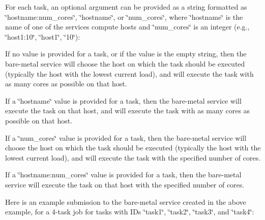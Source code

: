 For each task, an optional argument can be provided as a string formatted as \char`\"{}hostname\+:num\+\_\+cores\char`\"{}, \char`\"{}hostname\char`\"{}, or \char`\"{}num\+\_\+cores\char`\"{}, where \char`\"{}hostname\char`\"{} is the name of one of the service\textquotesingle{}s compute hosts and \char`\"{}num\+\_\+cores\char`\"{} is an integer (e.\+g., \char`\"{}host1\+:10\char`\"{}, \char`\"{}host1\char`\"{}, \char`\"{}10\char`\"{})\+:


\begin{DoxyItemize}
\item If no value is provided for a task, or if the value is the empty string, then the bare-\/metal service will choose the host on which the task should be executed (typically the host with the lowest current load), and will execute the task with as many cores as possible on that host.
\item If a \char`\"{}hostname\char`\"{} value is provided for a task, then the bare-\/metal service will execute the task on that host, and will execute the task with as many cores as possible on that host.
\item If a \char`\"{}num\+\_\+cores\char`\"{} value is provided for a task, then the bare-\/metal service will choose the host on which the task should be executed (typically the host with the lowest current load), and will execute the task with the specified number of cores.
\item If a \char`\"{}hostname\+:num\+\_\+cores\char`\"{} value is provided for a task, then the bare-\/metal service will execute the task on that host with the specified number of cores.
\end{DoxyItemize}

Here is an example submission to the bare-\/metal service created in the above example, for a 4-\/task job for tasks with I\+Ds \char`\"{}task1\char`\"{}, \char`\"{}task2\char`\"{}, \char`\"{}task3\char`\"{}, and \char`\"{}task4\char`\"{}\+:


